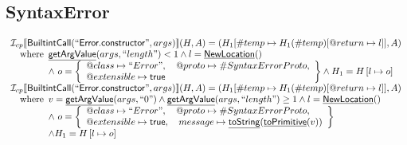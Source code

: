 \documentclass{article}
\makeatletter
\newcommand{\SF}[1]{\mbox{\textsf{#1}}}
\newcommand{\wherec}[1]{{\rm where}\begin{array}[t]{l}#1\end{array}}
\newcommand{\I}{\mathcal{I}}
\newcommand{\set}[1]{\left\{\begin{array}{l}#1\end{array}\right\}}
\newcommand{\lbr}{\llbracket}
\newcommand{\rbr}{\rrbracket}
\newcommand{\hf}[1]{\underline{\sf #1}}
\newcommand{\varprop}[1]{@#1}
\newcommand{\vtrue}{\SF{true}}
\makeatother
\begin{document}
\subsection{SyntaxError}
\[
\begin{array}{l}
\I _{cp}\lbr \SF{BuiltintCall}(``\SF{Error.constructor}",args)\rbr(H,A)
  = (H_1[\#temp \mapsto H_1(\#temp)[@return \mapsto l]], A)\\
\quad\wherec{
  \hf{getArgValue}(args, ``length") < 1 
  \land l=\hf{NewLocation}()\\
  \land\ o = \set{
    \varprop{class}\mapsto ``Error", \quad
    \varprop{proto}\mapsto \#SyntaxErrorProto,\\
    \varprop{extensible}\mapsto \vtrue
    }
  \land H_1=H\left[l\mapsto o\right]\\
  }\\
  
\I _{cp}\lbr \SF{BuiltintCall}(``\SF{Error.constructor}",args)\rbr(H,A)
  = (H_1[\#temp \mapsto H_1(\#temp)[@return \mapsto l]], A)\\
\quad\wherec{
  v = \hf{getArgValue}(args, ``0") \land \hf{getArgValue}(args, ``length") \geq 1
  \land l=\hf{NewLocation}()\\
  \land\ o = \set{
    \varprop{class}\mapsto ``Error", \quad
    \varprop{proto}\mapsto \#SyntaxErrorProto,\\
    \varprop{extensible}\mapsto \vtrue,  \quad
    message \mapsto \hf{toString}(\hf{toPrimitive}(v)) 
    }\\
  \land H_1=H\left[l\mapsto o\right]
  }\\

\end{array}
\]
\end{document}
